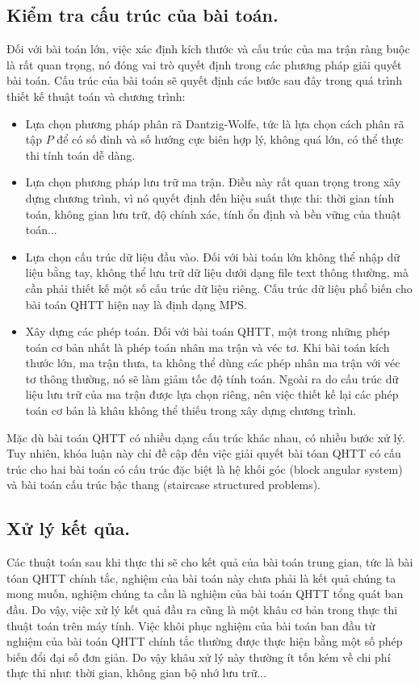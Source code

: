 \subsection{Kiểm tra cấu trúc của bài toán. }
Đối với bài toán lớn, việc xác định kích thước và cấu trúc của ma trận ràng buộc là rất quan trọng, nó đóng vai trò quyết định trong các phương pháp giải quyết bài toán. Cấu trúc của bài toán sẽ quyết định các bước sau đây trong quá trình thiết kế thuật toán và chương trình:
\begin{itemize}
\item Lựa chọn phương pháp phân rã Dantzig-Wolfe, tức là lựa chọn cách phân rã tập $P$ để có số đỉnh và số hướng cực biên hợp lý, không quá lớn, có thể thực thi tính toán dễ dàng.
\item Lựa chọn phương pháp lưu trữ ma trận. Điều này rất quan trọng trong xây dựng chương trình, vì nó quyết định đến hiệu suất thực thi: thời gian tính toán, không gian lưu trữ, độ chính xác, tính ổn định và bền vững của thuật toán...
\item Lựa chọn cấu trúc dữ liệu đầu vào. Đối với bài toán lớn không thể nhập dữ liệu bằng tay, không thể lưu trữ dữ liệu dưới dạng file text thông thường, mà cần phải thiết kế một số cấu trúc dữ liệu riêng. Cấu trúc dữ liệu phổ biến cho bài toán QHTT hiện nay là định dạng MPS.
\item Xây dựng các phép toán. Đối với bài toán QHTT, một trong những phép toán cơ bản nhất là phép toán nhân ma trận và véc tơ. Khi bài toán kích thước lớn, ma trận thưa, ta không thể dùng các phép nhân ma trận với véc tơ thông thường, nó sẽ làm giảm tốc độ tính toán. Ngoài ra do cấu trúc dữ liệu lưu trữ của ma trận được lựa chọn riêng, nên việc thiết kế lại các phép toán cơ bản là khâu không thể thiếu trong xây dựng chương trình.
\end{itemize}
Mặc dù bài toán QHTT có nhiều dạng cấu trúc khác nhau, có nhiều bước xử lý. Tuy nhiên, khóa luận này chỉ đề cập đến việc giải quyết bài tóan QHTT có cấu trúc cho hai bài toán có cấu trúc đặc biệt là hệ khối góc (block angular system) và bài toán cấu trúc bậc thang (staircase structured problems).

\subsection{Xử lý kết qủa. }
Các thuật toán sau khi thực thi sẽ cho kết quả của bài toán trung gian, tức là bài tóan QHTT chính tắc, nghiệm của bài toán này chưa phải là kết quả chúng ta mong muốn, nghiệm chúng ta cần là nghiệm của bài toán QHTT tổng quát ban đầu. Do vậy, việc xử lý kết quả đầu ra cũng là một khâu cơ bản trong thực thi thuật toán trên máy tính. Việc khôi phục nghiệm của bài toán ban đầu từ nghiệm của bài toán QHTT chính tắc thường được thực hiện bằng một số phép biến đổi đại số đơn giản. Do vậy khâu xử lý này thường ít tốn kém về chi phí thực thi như: thời gian, không gian bộ nhớ lưu trữ... 


